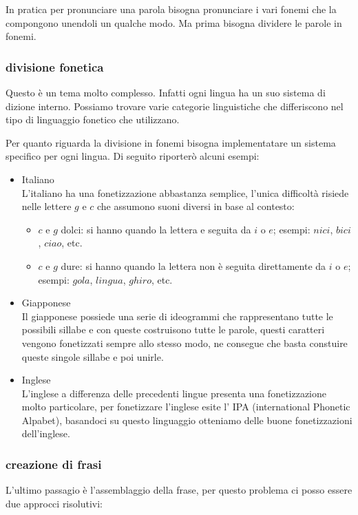 \documentclass{article}
\begin{document}
In pratica per pronunciare una parola bisogna pronunciare i vari fonemi che la compongono unendoli un qualche modo. Ma prima bisogna dividere le parole in fonemi.

\subsubsection{divisione fonetica}
Questo è un tema molto complesso. Infatti ogni lingua ha un suo sistema di dizione interno. Possiamo trovare varie categorie linguistiche che differiscono nel tipo di linguaggio fonetico che utilizzano.

Per quanto riguarda la divisione in fonemi bisogna implementatare un sistema specifico per ogni lingua. Di seguito riporterò alcuni esempi:

\begin{itemize}
    \item Italiano \\
        L'italiano ha una fonetizzazione abbastanza semplice, l'unica difficoltà risiede nelle lettere $g$ e $c$ che assumono suoni diversi in base al contesto: 
        \begin{itemize}
            \item $c$ e $g$ dolci: si hanno quando la lettera e seguita da $i$ o $e$; esempi: $nici$, $bici$, $ciao$, etc. 
            \item $c$ e $g$ dure: si hanno quando la lettera non è seguita direttamente da $i$ o $e$; esempi: $gola$, $lingua$, $ghiro$, etc.
        \end{itemize}
    \item Giapponese \\
        Il giapponese possiede una serie di ideogrammi che rappresentano tutte le possibili sillabe e con queste costruisono tutte le parole, questi caratteri vengono fonetizzati sempre allo stesso modo, ne consegue che basta constuire queste singole sillabe e poi unirle.
    \item Inglese \\
        L'inglese a differenza delle precedenti lingue presenta una fonetizzazione molto particolare, per fonetizzare l'inglese esite l' IPA (international Phonetic Alpabet), basandoci su questo linguaggio otteniamo delle buone fonetizzazioni dell'inglese.
\end{itemize}

\subsubsection{creazione di frasi}
L'ultimo passagio è l'assemblaggio della frase, per questo problema ci posso essere due approcci risolutivi: 
\end{document}
